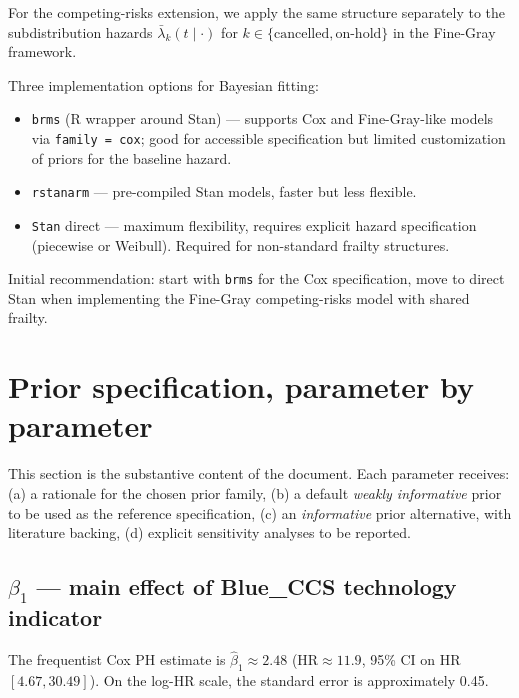 \documentclass[11pt,a4paper]{article}
\newcommand{\HR}{\mathrm{HR}}
\begin{document}
For the competing-risks extension, we apply the same structure separately to the subdistribution hazards $\bar\lambda_k(t \mid \cdot)$ for $k \in \{\text{cancelled}, \text{on-hold}\}$ in the Fine-Gray framework.

\begin{technote}
Three implementation options for Bayesian fitting:
\begin{itemize}
  \item \texttt{brms} (R wrapper around Stan) --- supports Cox and Fine-Gray-like models via \texttt{family = cox}; good for accessible specification but limited customization of priors for the baseline hazard.
  \item \texttt{rstanarm} --- pre-compiled Stan models, faster but less flexible.
  \item \texttt{Stan} direct --- maximum flexibility, requires explicit hazard specification (piecewise or Weibull). Required for non-standard frailty structures.
\end{itemize}
Initial recommendation: start with \texttt{brms} for the Cox specification, move to direct Stan when implementing the Fine-Gray competing-risks model with shared frailty.
\end{technote}

\section{Prior specification, parameter by parameter}

This section is the substantive content of the document. Each parameter receives:
(a) a rationale for the chosen prior family,
(b) a default \emph{weakly informative} prior to be used as the reference specification,
(c) an \emph{informative} prior alternative, with literature backing,
(d) explicit sensitivity analyses to be reported.

\subsection{$\beta_1$ --- main effect of Blue\_CCS technology indicator}

The frequentist Cox PH estimate is $\hat\beta_1 \approx 2.48$ ($\HR \approx 11.9$, 95\% CI on HR $[4.67, 30.49]$). On the log-HR scale, the standard error is approximately 0.45.
\end{document}
